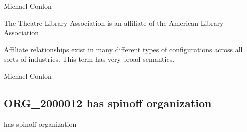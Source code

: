 \documentclass[letterpaper,10pt,english]{sphinxmanual}
\begin{document}
\begin{sphinxShadowBox}

\sphinxAtStartPar
Michael Conlon 
\end{sphinxShadowBox}

\begin{sphinxShadowBox}

\sphinxAtStartPar
The Theatre Library Association is an affiliate of the American Library Association
\end{sphinxShadowBox}

\begin{sphinxShadowBox}

\sphinxAtStartPar
Affiliate relationships exist in many different types of configurations across all sorts of industries.  This term has very broad semantics.
\end{sphinxShadowBox}

\begin{sphinxShadowBox}

\sphinxAtStartPar
{}
\end{sphinxShadowBox}

\begin{sphinxShadowBox}

\sphinxAtStartPar
Michael Conlon 
\end{sphinxShadowBox}
\begin{quote}

\ignorespaces \end{quote}


\subsection{ORG\_2000012 \sphinxhyphen{} has spin\sphinxhyphen{}off organization}
\label{\detokenize{doc-ORG_2000012:org-2000012-has-spin-off-organization}}\label{\detokenize{doc-ORG_2000012:index-0}}\label{\detokenize{doc-ORG_2000012::doc}}
\begin{sphinxShadowBox}

\sphinxAtStartPar
has spin\sphinxhyphen{}off organization
\end{sphinxShadowBox}
\end{document}
